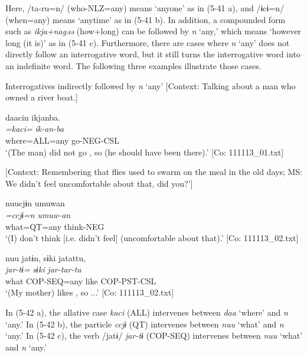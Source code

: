 Here, /ta-ru=n/ (who-NLZ=any) means ‘anyone’ as in (5-41 a), and /ɨcɨ=n/ (when=any) means ‘anytime’ as in (5-41 b). In addition, a compounded form such as \textit{ikja+nagəə} (how+long) can be followed by \textit{n} ‘any,’ which means ‘however long (it is)’ as in (5-41 c). Furthermore, there are cases where \textit{n} ‘any’ does not directly follow an interrogative word, but it still turns the interrogative word into an indefinite word. The following three examples illustrate those cases.

\ea \label{ex:5:42}   Interrogatives indirectly followed by \textit{n} ‘any’
 \ea \label{ex:5:42a} [Context: Talking about a man who owned a river boat.]

\glll  daacin  ikjanba.\\
\textit{=kaci=}  \textit{ik-an-ba}\\
where=ALL=any  go-NEG-CSL\\
\glt ‘(The man) did not go , so (he should have been there).’ [Co: 111113\_01.txt]

 \ex \label{ex:5:b} [Context: Remembering that flies used to swarm on the meal in the old days; MS: We didn’t feel uncomfortable about that, did you?’]

\glll  nuucjɨn  umuwan\\
\textit{=ccjɨ=n}  \textit{umuw-an}\\
what=QT=any  think-NEG\\
\glt ‘(I) don’t think [i.e. didn’t feel]  (uncomfortable about that).’ [Co: 111113\_02.txt]

 \ex \label{ex:5:c} %
\glll  nuu  jatɨn,  sɨki  jatattu,\\
\textit{}  \textit{jar-tɨ=}  \textit{sɨki}  \textit{jar-tar-tu}\\
what  COP-SEQ=any  like  COP-PST-CSL\\
\glt ‘(My mother) likes , so ...’ [Co: 111113\_02.txt]
\z
\z

In (5-42 a), the allative case \textit{kaci} (ALL) intervenes between \textit{daa} ‘where’ and \textit{n} ‘any.’ In (5-42 b), the particle \textit{ccjɨ} (QT) intervenes between \textit{nuu} ‘what’ and \textit{n} ‘any.’ In (5-42 c), the verb /jatɨ/ \textit{jar-tɨ} (COP-SEQ) intervenes between \textit{nuu} ‘what’ and \textit{n} ‘any.’
